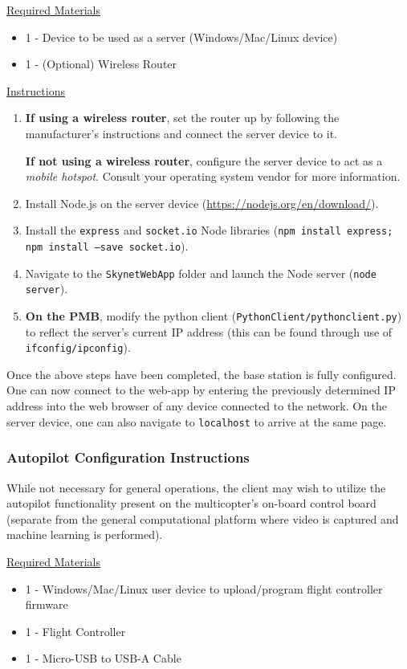 \documentclass[10pt,letterpaper]{article}
\begin{document}
\underline{Required Materials}
\begin{itemize}
\item 1 - Device to be used as a server (Windows/Mac/Linux device)
\item 1 - (Optional) Wireless Router
\end{itemize}

\underline{Instructions}
\begin{enumerate}
\item \textbf{If using a wireless router}, set the router up by following the manufacturer's instructions and connect the server device to it.

\textbf{If not using a wireless router}, configure the server device to act as a \textit{mobile hotspot}. Consult your operating system vendor for more information.
\item Install Node.js on the server device (\url{https://nodejs.org/en/download/}).
\item Install the \texttt{express} and \texttt{socket.io} Node libraries (\texttt{npm install express; npm install --save socket.io}).
\item Navigate to the \texttt{SkynetWebApp} folder and launch the Node server (\texttt{node server}). 
\item \textbf{On the PMB}, modify the python client (\texttt{PythonClient/pythonclient.py}) to reflect the server's current IP address (this can be found through use of \texttt{ifconfig/ipconfig}).
\end{enumerate}

Once the above steps have been completed, the base station is fully configured. One can now connect to the web-app by entering the previously determined IP address into the web browser of any device connected to the network. On the server device, one can also navigate to \texttt{localhost} to arrive at the same page.

\subsubsection{Autopilot Configuration Instructions}
While not necessary for general operations, the client may wish to utilize the autopilot functionality present on the multicopter's on-board control board (separate from the general computational platform where video is captured and machine learning is performed). 

\underline{Required Materials}
\begin{itemize}
\item 1 - Windows/Mac/Linux user device to upload/program flight controller firmware
\item 1 - Flight Controller
\item 1 - Micro-USB to USB-A Cable
\end{itemize}
\end{document}
